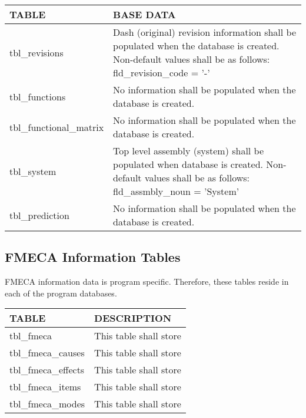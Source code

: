 \documentclass[11pt, 12pt, twoside, onecolumn]{article}
\begin{document}
    \begin{landscape}
    \begin{longtable}{ll}
    TABLE & BASE DATA \\
    \hline
    tbl\_revisions & Dash (original) revision information shall be populated when the database is created. Non-default values shall be as follows: fld\_revision\_code = '-' \\
    tbl\_functions & No information shall be populated when the database is created. \\
    tbl\_functional\_matrix & No information shall be populated when the database is created. \\
    tbl\_system & Top level assembly (system) shall be populated when database is created. Non-default values shall be as follows: fld\_assmbly\_noun = 'System' \\
    tbl\_prediction & No information shall be populated when the database is created. \\
    \hline
    \end{longtable}
    \end{landscape}

\subsection{\bf \large FMECA Information Tables}

\noindent FMECA information data is program specific.  Therefore, these tables reside in each of the program databases. \\

    \begin{landscape}
    \begin{longtable}{ll}
    TABLE & DESCRIPTION \\
    \hline
    tbl\_fmeca & This table shall store \\
    tbl\_fmeca\_causes & This table shall store \\
    tbl\_fmeca\_effects & This table shall store \\
    tbl\_fmeca\_items & This table shall store \\
    tbl\_fmeca\_modes & This table shall store \\
    \hline
    \end{longtable}
    \end{landscape}
\end{document}
